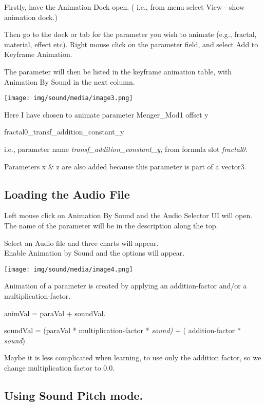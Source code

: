 Firstly, have the Animation Dock open. ( i.e., from menu select View -
show animation dock.)

Then go to the dock or tab for the parameter you wish to animate (e.g.,
fractal, material, effect etc). Right mouse click on the parameter
field, and select Add to Keyframe Animation.

The parameter will then be listed in the keyframe animation table, with
Animation By Sound in the next column.

\texttt{[image: img/sound/media/image3.png]}

Here I have chosen to animate parameter Menger\_Mod1 offset y

fractal0\_transf\_addition\_constant\_y

i.e., parameter name \emph{transf\_addition\_constant\_y;} from formula
slot \emph{fractal0.}

Parameters x \& z are also added because this parameter is part of a
vector3.

\subsection{Loading the Audio File}\label{loading-the-audio-file}

Left mouse click on Animation By Sound and the Audio Selector UI will open.
The name of the parameter will be in the description along the top.

Select an Audio file and three charts will appear.\\
Enable Animation by Sound and the options will appear.

\texttt{[image: img/sound/media/image4.png]}

Animation of a parameter is created by applying an addition-factor
and/or a multiplication-factor.

animVal = paraVal + soundVal.

soundVal = (paraVal * multiplication-factor * \emph{sound)} + (
addition-factor * \emph{sound})

Maybe it is less complicated when learning, to use only the addition factor,
so we change multiplication factor to 0.0.

\subsection{Using Sound Pitch mode.}\label{using-sound-pitch-mode.}

